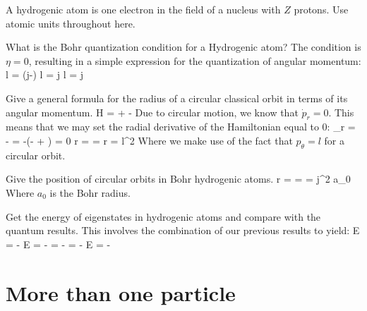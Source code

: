 A hydrogenic atom is one electron in the field of a nucleus with $Z$ protons. Use atomic units throughout here.
\benu
\item What is the Bohr quantization condition for a Hydrogenic atom?
\newline The condition is $\eta = 0$, resulting in a simple expression for the quantization of angular momentum:
\be
l = \hbar(j-\eta) \thus l = \hbar j \quad{}\quad l = j
\ee
\item Give a general formula for the radius of a circular classical orbit in terms of its angular momentum.
\be
H =  +   - 
\ee
Due to circular motion, we know that $\dot{p}_r = 0$. This means that we may set the radial derivative of the Hamiltonian equal to 0:
\be
{}_r = - = -\left(- + \right) = 0 \thus r =  =  \quad{}\quad r = l^2
\ee
Where we make use of the fact that $p_\theta = l$ for a circular orbit.
\item Give the position of circular orbits in Bohr hydrogenic atoms.
\be
r =  =  = j^2 a_0
\ee
Where $a_0$ is the Bohr radius.
\item Get the energy of eigenstates in hydrogenic atoms and compare with the quantum results.
\newline This involves the combination of our previous results to yield:
\be
E =  -  \quad{}\quad E = -  = - = - \quad{}\quad E = -
\ee

\enu

\newpage
\part{More than one particle}

